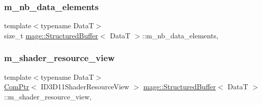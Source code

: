 \hypertarget{structmage_1_1_structured_buffer_a92c53203287f6ef5ab8ed88c7b588e72}{}\label{structmage_1_1_structured_buffer_a92c53203287f6ef5ab8ed88c7b588e72} 
\subsubsection{\texorpdfstring{m\+\_\+nb\+\_\+data\+\_\+elements}{m\_nb\_data\_elements}}
{\footnotesize\ttfamily template$<$typename DataT$>$ \\
size\+\_\+t \hyperlink{structmage_1_1_structured_buffer}{mage\+::\+Structured\+Buffer}$<$ DataT $>$\+::m\+\_\+nb\+\_\+data\+\_\+elements\hspace{0.3cm}{\ttfamily [mutable]}, {\ttfamily [private]}}

\hypertarget{structmage_1_1_structured_buffer_aa7a7c6da909ae8bed3c408f672a68377}{}\label{structmage_1_1_structured_buffer_aa7a7c6da909ae8bed3c408f672a68377} 
\subsubsection{\texorpdfstring{m\+\_\+shader\+\_\+resource\+\_\+view}{m\_shader\_resource\_view}}
{\footnotesize\ttfamily template$<$typename DataT$>$ \\
\hyperlink{namespacemage_ae74f374780900893caa5555d1031fd79}{Com\+Ptr}$<$ I\+D3\+D11\+Shader\+Resource\+View $>$ \hyperlink{structmage_1_1_structured_buffer}{mage\+::\+Structured\+Buffer}$<$ DataT $>$\+::m\+\_\+shader\+\_\+resource\+\_\+view\hspace{0.3cm}{\ttfamily [mutable]}, {\ttfamily [private]}}

